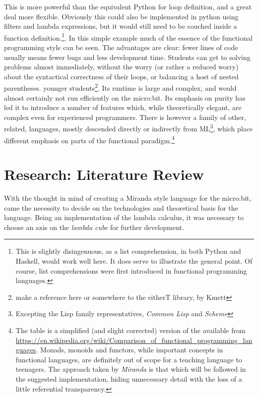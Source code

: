 \documentclass[12pt, a4paper]{report}
\begin{document}
This is more powerful than the equivalent Python for loop definition, and a great deal more
flexible. Obviously this could also be implemented in python using filters and lambda expressions,
but it would still need to be couched inside a function definition.\footnote{This is slightly
disingenuous, as a list comprehension, in both Python and Haskell, would work well here. It does
serve to illustrate the general point. Of course, list comprehensions were first introduced in
functional programming languages.}. In this simple example much of the essence of the functional
programming style can be seen. The advantages are clear: fewer lines of code usually means fewer
bugs and less development time. Students can get to solving problems almost immediately, without the
worry (or rather a reduced worry) about the syntactical correctness of their loops, or balancing
a host of nested parentheses. %
younger students\footnote{make a reference here or somewhere to the eitherT library, by Kmett}.
Its runtime is large and complex, and would almost certainly not run efficiently on the micro:bit.
Its emphasis on purity has led it to introduce a number of features which, while theoretically
elegant, are complex even for experienced programmers. There is however a family of other, related,
languages, mostly descended directly or indirectly from ML\footnote{Excepting the Lisp family
representatives, \textit{Common Lisp} and \textit{Scheme}}, which place different emphasis on parts
of the functional paradigm.\footnote{The table is a simplified (and slight corrected) version of the
available from \url{https://en.wikipedia.org/wiki/Comparison_of_functional_programming_languages}.
Monads, monoids and functors, while important concepts in functional languages, are definitely out
of scope for a teaching language to teenagers. The approach taken by \textit{Miranda} is that which
will be followed in the suggested implementation, hiding unnecessary detail with the loss of a
little referential transparency.}

\section{Research: Literature Review}
With the thought in mind of creating a Miranda style language for the micro:bit, came the necessity
to decide on the technologies and theoretical basis for the language. Being an implementation of the
lambda calculus, it was necessary to choose an axis on the \textit{lambda cube} for further
development. 
\end{document}
